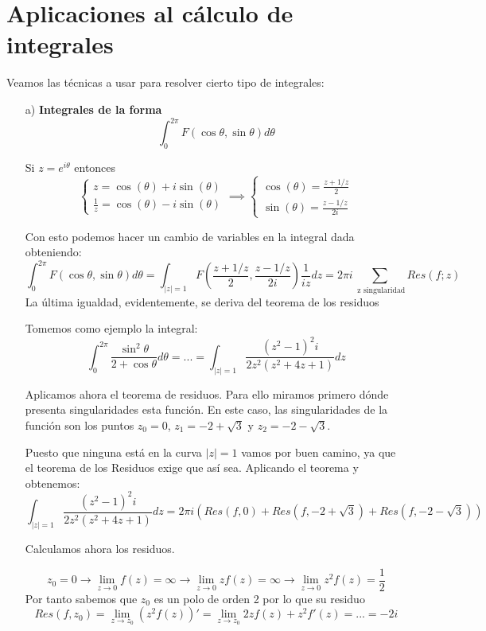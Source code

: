 \documentclass{apuntes}
\begin{document}
\section{Aplicaciones al cálculo de integrales}
Veamos las técnicas a usar para resolver cierto tipo de integrales:
\begin{enumerate}
\item[a)] \textbf{Integrales de la forma}
\[\int_0^{2π}F(\cos \theta, \sin \theta) d \theta\]

Si $z=e^{i\theta}$ entonces
\[\left\{ \begin{aligned}z=\cos(\theta)+i\sin(\theta)\\
\frac{1}{z}=\cos(\theta)-i\sin(\theta) \end{aligned} \right. \implies \left\{\begin{aligned} \cos(\theta)=\frac{z+1/z}{2}\\ \sin(\theta)=\frac{z-1/z}{2i} \end{aligned} \right.\]

Con esto podemos hacer un cambio de variables en la integral dada obteniendo:
\[\int_0^{2π}F(\cos \theta, \sin \theta) d \theta = \int_{|z|=1} F\left( \frac{z+1/z}{2}, \frac{z-1/z}{2i}  \right)\frac{1}{iz}dz = 2πi\sum_{\text{ z singularidad}} Res(f;z)\]
La última igualdad, evidentemente, se deriva del teorema de los residuos

\begin{example}
Tomemos como ejemplo la integral:
\[\int_0^{2π} \frac{\sin^2 \theta}{2+\cos \theta}d\theta = ... = \int_{|z|=1}\frac{(z^2-1)^2i}{2z^2(z^2+4z+1)}dz\]

Aplicamos ahora el teorema de residuos. Para ello miramos primero dónde presenta singularidades esta función. En este caso, las singularidades de la función son los puntos $z_0=0$, $z_1=-2+\sqrt{3}$ y $z_2=-2-\sqrt{3}$.

Puesto que ninguna está en la curva $|z|=1$ vamos por buen camino, ya que el teorema de los Residuos exige que así sea. Aplicando el teorema y obtenemos:
\[\int_{|z|=1}\frac{(z^2-1)^2i}{2z^2(z^2+4z+1)}dz = 2πi\left(Res(f,0)+Res(f,-2+\sqrt{3})+Res(f,-2-\sqrt{3})\right)\]

Calculamos ahora los residuos.

\[z_0=0 \to \lim_{z \to 0} f(z) = \infty \to \lim_{z \to 0} zf(z) = \infty \to \lim_{z \to 0} z^2f(z)=\frac{1}{2}\]
Por tanto sabemos que $z_0$ es un polo de orden 2 por lo que su residuo
\[Res(f,z_0)=\lim_{z \to z_0}(z^2f(z))' = \lim_{z \to z_0}2zf(z)+z^2f'(z) = ... = -2i\]


\end{example}
\end{enumerate}
\end{document}
